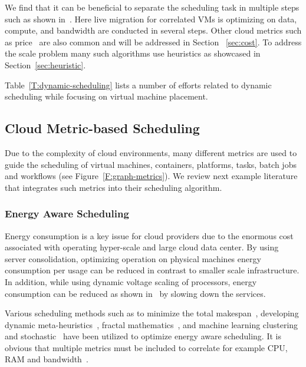 \documentclass[final,5p,times,twocolumn]{elsarticle}
\begin{document}
We find that it can be beneficial to separate the scheduling task in
multiple steps such as shown in~\cite{sun2015live}. Here live
migration for correlated VMs is optimizing on data, compute, and
bandwidth are conducted in several steps. Other cloud metrics such as
price~\cite{tordsson2012cloud} are also common and will be addressed
in Section ~\ref{sec:cost}.  To address the scale problem many such
algorithms use heuristics as showcased in Section~\ref{sec:heuristic}.

Table~\ref{T:dynamic-scheduling} lists a number of efforts related to
dynamic scheduling while focusing on virtual machine placement.






\subsection{Cloud Metric-based Scheduling}\label{sec:vm-scheduling}

Due to the complexity of cloud environments, many different metrics
are used to guide the scheduling of virtual machines, containers,
platforms, tasks, batch jobs and workflows (see
Figure~\ref{F:graph-metrics}). We review next example literature that
integrates such metrics into their scheduling algorithm.


% 


\subsubsection{Energy Aware Scheduling}\label{sec:energy}

Energy consumption is a key issue for cloud providers due to the
enormous cost associated with operating hyper-scale and large cloud
data center. By using server consolidation, optimizing operation on
physical machines energy consumption per usage can be reduced in
contrast to smaller scale infrastructure.  In addition, while using
dynamic voltage scaling of processors, energy consumption can be
reduced as shown in~\cite{las09dvfs,las10dvfs,calheiros2014energy} by
slowing down the services.

Various scheduling methods such as to minimize the total
makespan~\cite{bessis2013using}, developing dynamic
meta-heuristics~\cite{bi2017application}, fractal
mathematics~\cite{duan2016energy}, and machine learning clustering and
stochastic~\cite{bui2017energy} have been utilized to optimize energy
aware scheduling. It is obvious that multiple metrics must be included to correlate for
example CPU, RAM and bandwidth~\cite{zhu2017three}.
\end{document}
